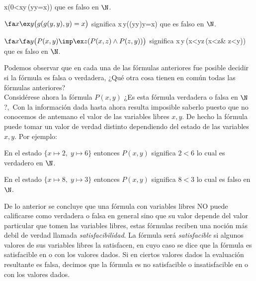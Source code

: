 \documentclass[11pt,letterpaper]{article}
\begin{document}
\beqs
\fabb x\in\N\big(0<x\Imp \exbb y\in\N\,(y\cdot y=x)\big)
\eeqs
que es falso en $\N$.
\item $\fa x\ex y\big(g(g(y,y),y)=x\big)$ significa 
\beqs
\fabb x\in\N\,\exbb y\in\N\big((y\cdot y)\cdot y=x\big) 
\eeqs
que es falso en $\N$.
\item $\fa x\fa y\big(P(x,y)\imp \ex z(P(x,z)\land P(z,y))\big)$ significa 
\beqs
\fabb x\in\N\,\fabb y\in\N\,\big(x<y\Imp \exbb z\in\N\,(x<z\;\&\; z<y)\big)
\eeqs
que es falso en $\N$.
\ee

Podemos observar que en cada una de las fórmulas anteriores fue posible decidir
si la fórmula es falsa o verdadera, ¿Qué otra cosa tienen en común
todas las fórmulas anteriores? \\

Considérese ahora la fórmula $P(x,y)$ ¿Es esta fórmula verdadera o falsa en $\N$?,\
Con la información dada hasta ahora resulta imposible saberlo  puesto que no conocemos de
antemano el valor de las variables libres $x,y$. De hecho la fórmula
puede tomar un valor de verdad distinto dependiendo del estado de las variables
$x,y$. Por ejemplo:
\bi
\item En el estado $\{x\mapsto 2,\;y\mapsto 6\}$ entonces $P(x,y)$ significa $2<6$ lo cual es verdadero
  en $\N$.
\item En el estado $\{x\mapsto 8,\;y\mapsto 3\}$ entonces $P(x,y)$ significa $8<3$ lo cual es falso
  en $\N$.
\ei

De lo anterior se concluye que una fórmula con variables libres NO puede
calificarse como verdadera o falsa en general sino que su valor depende del
valor particular que tomen las variables libres, estas fórmulas reciben una
noción más debil de verdad llamada \emph{satisfacibilidad}. La fórmula será
\emph{satisfacible} si algunos valores de sus variables libres la satisfacen, en cuyo caso se dice que la fórmula es
satisfacible en o con los valores dados. Si en ciertos valores dados
la evaluación resultante es falsa, decimos que la fórmula es no satisfacible o
insatisfacible en o con los valores dados. %
\end{document}

